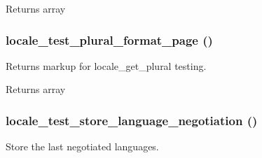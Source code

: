 \begin{DoxyReturn}{Returns}
array 
\end{DoxyReturn}
\hypertarget{locale__test_8module_ad8530e02353ed84ac27f4fb5ec73deab}{
\subsubsection[{locale\_\-test\_\-plural\_\-format\_\-page}]{\setlength{\rightskip}{0pt plus 5cm}locale\_\-test\_\-plural\_\-format\_\-page ()}}
\label{locale__test_8module_ad8530e02353ed84ac27f4fb5ec73deab}
Returns markup for locale\_\-get\_\-plural testing.

\begin{DoxyReturn}{Returns}
array 
\end{DoxyReturn}
\hypertarget{locale__test_8module_ab9c352db2ddd976f5fc2d46bf640d4b8}{
\subsubsection[{locale\_\-test\_\-store\_\-language\_\-negotiation}]{\setlength{\rightskip}{0pt plus 5cm}locale\_\-test\_\-store\_\-language\_\-negotiation ()}}
\label{locale__test_8module_ab9c352db2ddd976f5fc2d46bf640d4b8}
Store the last negotiated languages. 